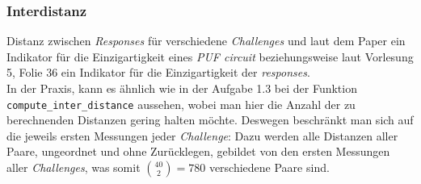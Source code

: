 \subsubsection*{Interdistanz}
\begin{comment}
VL 5, Folie 36:
Distance between responses for different challenges. 
Indicates uniqueness of responses.

Doktorarbeit, S. 22:
A PUF response inter-distance is a random variable 
describing the distance between two PUF responses 
from different PUF instances using the same challenge:


Paper, S. 1132:
Inter-PUF variation: Defined as the number of bits
in a PUF response that vary between different
devices for a set of shared challenges. This is 
due to differences between the physical ICs and 
is also commonly represented in the form of a 
statistical distribution. The inter-PUF variation 
is a measure of the uniqueness of an individual 
PUF circuit
\end{comment}

Distanz zwischen \textit{Responses} für verschiedene 
\textit{Challenges} und laut dem Paper ein Indikator 
für die Einzigartigkeit eines \textit{PUF circuit}
beziehungsweise laut Vorlesung 5, Folie 36 ein Indikator
für die Einzigartigkeit der \textit{responses}.\\ 


In der Praxis, kann es ähnlich wie in der Aufgabe 1.3 
bei der Funktion \verb|compute_inter_distance| 
aussehen, wobei man hier die Anzahl der
zu berechnenden Distanzen gering halten möchte.
Deswegen beschränkt man sich auf die jeweils ersten 
Messungen jeder \textit{Challenge}: Dazu werden alle 
Distanzen aller Paare, ungeordnet und ohne Zurücklegen, 
gebildet von den ersten Messungen aller 
\textit{Challenges}, was somit 
\footnotesize $\binom{40}{2}=780$ \normalsize
verschiedene Paare sind. 

